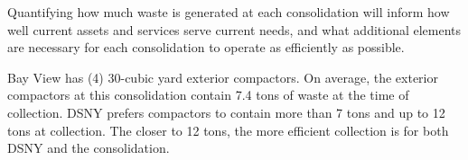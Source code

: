 
    Quantifying how much waste is generated at each consolidation will inform how well current assets and services serve current needs, and what additional elements are necessary for each consolidation to operate as efficiently as possible.
    
    Bay View has (4) 30-cubic yard exterior compactors. On average, the exterior compactors at this consolidation contain 7.4 tons of waste at the time of collection. DSNY prefers compactors to contain more than 7 tons and up to 12 tons at collection. The closer to 12 tons, the more efficient collection is for both DSNY and the consolidation.
